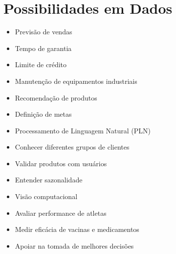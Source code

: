 \documentclass{article}
\begin{document}
\section*{Possibilidades em Dados}
\begin{itemize}
    \item Previsão de vendas
    \item Tempo de garantia
    \item Limite de crédito
    \item Manutenção de equipamentos industriais
    \item Recomendação de produtos
    \item Definição de metas
    \item Processamento de Linguagem Natural (PLN)
    \item Conhecer diferentes grupos de clientes
    \item Validar produtos com usuários
    \item Entender sazonalidade
    \item Visão computacional
    \item Avaliar performance de atletas
    \item Medir eficácia de vacinas e medicamentos
    \item Apoiar na tomada de melhores decisões
\end{itemize}
\end{document}
